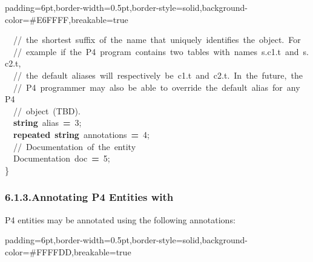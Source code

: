 \documentclass[11pt]{article}
\begin{document}
{\begin{mdbmargintb}{6pt}{6pt}
\begin{mdblock}{padding=6pt,border-width=0.5pt,border-style=solid,background-color=\#E6FFFF,breakable=true}
\begin{mdpre}
{{~~{//~the~shortest~suffix~of~the~name~that~uniquely~identifies~the~object.~For}\\
~~{//~example~if~the~P4~program~contains~two~tables~with~names~s.c1.t~and~s.c2.t,}\\
~~{//~the~default~aliases~will~respectively~be~c1.t~and~c2.t.~In~the~future,~the}\\
~~{//~P4~programmer~may~also~be~able~to~override~the~default~alias~for~any~P4}\\
~~{//~object~(TBD).}\\
~~{\bfseries{string}}~alias~{\bfseries{=}}~{3};\\
~~{\bfseries{repeated}}~{\bfseries{string}}~annotations~{\bfseries{=}}~{4};\\
~~{//~Documentation~of~the~entity}\\
~~Documentation~doc~{\bfseries{=}}~{5};\\
\}}}%
\end{mdpre}%
\end{mdblock}%
\end{mdbmargintb}%

\subsubsection{6.1.3.\hspace*{0.5em}Annotating P4 Entities with }\label{sec-annotating-p4-entities-with-documentation}%

\noindent{}P4 entities may be annotated using the following annotations:%

\begin{mdbmargintb}{6pt}{6pt}%
\begin{mdblock}{padding=6pt,border-width=0.5pt,border-style=solid,background-color=\#FFFFDD,breakable=true}%
\begin{mdpre}%
\end{mdpre}%
\end{mdblock}%
\end{mdbmargintb}%

}
\end{document}
